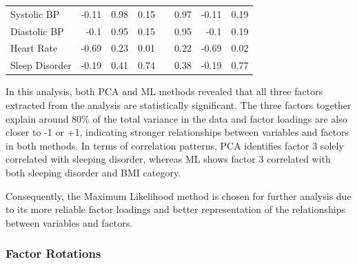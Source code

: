 \documentclass[11pt]{article}
\begin{document}
\begin{table}[h]
{\begin{tabular}{l|rrr|r|rrr|}
						\multicolumn{1}{|l|}{Systolic BP}       & \multicolumn{1}{r|}{-0.11}        & \multicolumn{1}{r|}{0.98}         & 0.15                              &                       & \multicolumn{1}{r|}{0.97}         & \multicolumn{1}{r|}{-0.11}        & 0.19                              \\ \cline{1-4} \cline{6-8} 
						\multicolumn{1}{|l|}{Diastolic BP}      & \multicolumn{1}{r|}{-0.1}         & \multicolumn{1}{r|}{0.95}         & 0.15                              &                       & \multicolumn{1}{r|}{0.95}         & \multicolumn{1}{r|}{-0.1}         & 0.19                              \\ \cline{1-4} \cline{6-8} 
						\multicolumn{1}{|l|}{Heart Rate}        & \multicolumn{1}{r|}{-0.69}        & \multicolumn{1}{r|}{0.23}         & 0.01                              &                       & \multicolumn{1}{r|}{0.22}         & \multicolumn{1}{r|}{-0.69}        & 0.02                              \\ \cline{1-4} \cline{6-8} 
						\multicolumn{1}{|l|}{Sleep Disorder}    & \multicolumn{1}{r|}{-0.19}        & \multicolumn{1}{r|}{0.41}         & 0.74                              &                       & \multicolumn{1}{r|}{0.38}         & \multicolumn{1}{r|}{-0.19}        & 0.77                              \\ \cline{1-4} \cline{6-8} 
					\end{tabular}%
				}
				\label{tab:pca_mle}
			\end{table}
			
		In this analysis, both PCA and ML methods revealed that all three factors extracted from the analysis are statistically significant. The three factors together explain around 80\% of the total variance in the data and factor loadings are also closer to -1 or +1, indicating stronger relationships between variables and factors in both methods. In terms of correlation patterns, PCA identifies factor 3 solely correlated with sleeping disorder, whereas ML shows factor 3 correlated with both sleeping disorder and BMI category.
			
		Consequently, the Maximum Likelihood method is chosen for further analysis due to its more reliable factor loadings and better representation of the relationships between variables and factors.
	
	
		\subsubsection{Factor Rotations}
			
\end{document}
